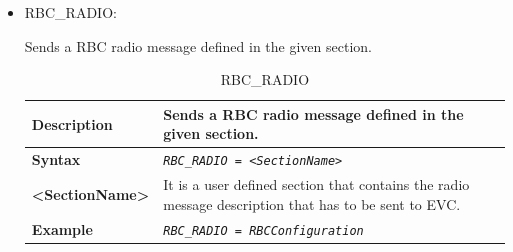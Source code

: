 \documentclass{template/openetcs}
\begin{document}
\begin{itemize}
\begin{longtable}{|l|l|}
				\hline \hline
				
			\end{longtable}
			
		\item RBC\_RADIO:
								
			Sends a RBC radio message defined in the given section.
			
			\begin{longtable}{|l|l|l|}
				\caption{RBC\_RADIO}\\
				\hline
				
					\begin{minipage}[t]{0.22\linewidth} \textbf{Description} \end{minipage} 
				&	\begin{minipage}[t]{0.78\linewidth} Sends a RBC radio message defined in the given section. \end{minipage} \\
								
				\hline
								
					\begin{minipage}[t]{0.22\linewidth} \textbf{Syntax}	\end{minipage}
				&	\multicolumn{2}{l|}{ \begin{minipage}[t]{0.78\linewidth} \emph{\texttt{RBC\_RADIO = <SectionName>}} \end{minipage} } \\
				
				\hline
				
					\begin{minipage}[t]{0.22\linewidth} \textbf{<SectionName>} \end{minipage}
				&	\multicolumn{2}{l|}{ \begin{minipage}[t]{0.78\linewidth} It is a user defined section that contains the radio message description that has to be sent to EVC. \end{minipage} } \\
				
				\hline
															
					\begin{minipage}[t]{0.22\linewidth} \textbf{Example} \end{minipage}
				&	\multicolumn{2}{l|}{ \begin{minipage}[t]{0.78\linewidth} \emph{\texttt{RBC\_RADIO = RBCConfiguration}} \end{minipage} } \\
				
				\hline \hline
				

\end{longtable}
\end{itemize}
\end{document}
